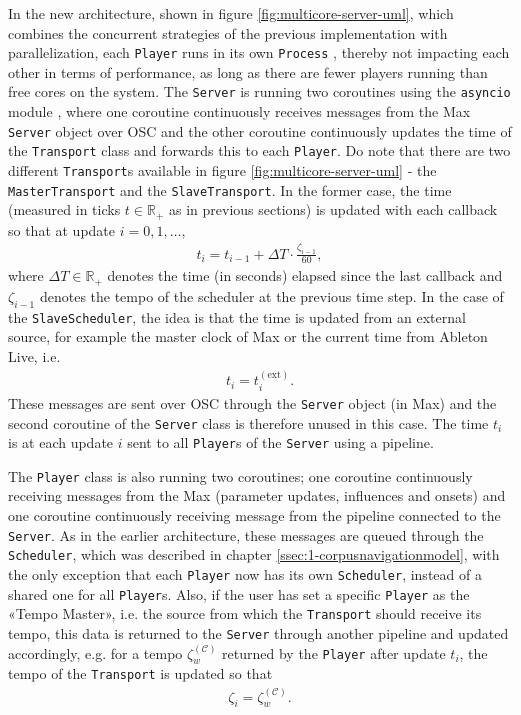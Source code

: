 In the new architecture, shown in figure \ref{fig:multicore-server-uml}, which combines the concurrent strategies of the previous implementation with parallelization, each \texttt{Player} runs in its own \texttt{Process} \cite{pymultiproc2021}, thereby not impacting each other in terms of performance, as long as there are fewer players running than free cores on the system. The \texttt{Server} is running two coroutines using the \texttt{asyncio} module \cite{pyasyncio2021}, where one coroutine continuously receives messages from the Max \texttt{Server} object over OSC and the other coroutine continuously updates the time of the \texttt{Transport} class and forwards this to each \texttt{Player}. Do note that there are two different \texttt{Transport}s available in figure \ref{fig:multicore-server-uml} - the \texttt{MasterTransport} and the \texttt{SlaveTransport}. In the former case, the time (measured in ticks $t \in \mathbb R_+$ as in previous sections) is updated with each callback so that at update $i = 0,1,\dots$,
	\begin{align}
		t_i = t_{i-1} + \Delta T \cdot \frac{\zeta_{i-1}}{60},
	\end{align}
	where $\Delta T \in \mathbb R_+$ denotes the time (in seconds) elapsed since the last callback and $\zeta_{i-1}$ denotes the tempo of the scheduler at the previous time step. In the case of the \texttt{SlaveScheduler}, the idea is that the time is updated from an external source, for example the master clock of Max or the current time from Ableton Live, i.e.
		\begin{align}
			t_i = t^{(\text{ext})}_i	.
		\end{align}
	These messages are sent over OSC through the \texttt{Server} object (in Max) and the second coroutine of the \texttt{Server} class is therefore unused in this case. The time $t_i$ is at each update $i$ sent to all \texttt{Player}s of the \texttt{Server} using a pipeline.
	
The \texttt{Player} class is also running two coroutines; one coroutine continuously receiving messages from the Max (parameter updates, influences and  onsets) and one coroutine continuously receiving message from the pipeline connected to the \texttt{Server}. As in the earlier architecture, these messages are queued through the \texttt{Scheduler}, which was described in chapter \ref{ssec:1-corpusnavigationmodel}, with the only exception that each \texttt{Player} now has its own \texttt{Scheduler}, instead of a shared one for all \texttt{Player}s. Also, if the user has set a specific \texttt{Player} as the «Tempo Master», i.e. the source from which the \texttt{Transport} should receive its tempo, this data is returned to the \texttt{Server} through another pipeline and updated accordingly, e.g. for a tempo $\zeta^{(\mathcal C)}_w$ returned by the \texttt{Player} after update $t_i$, the tempo of the \texttt{Transport} is updated so that
	\begin{align}
		\zeta_i = \zeta^{(\mathcal C)}_w.
	\end{align}
 
	



